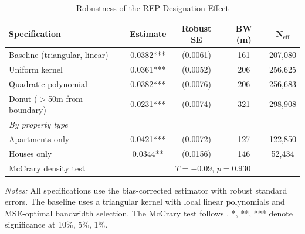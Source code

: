 \begin{table}[htbp]
\centering
\caption{Robustness of the REP Designation Effect}
\label{tab:robustness}
\begin{tabular}{lcccc}
\toprule
Specification & Estimate & Robust SE & BW (m) & N$_{\text{eff}}$ \\
\midrule
Baseline (triangular, linear) & 0.0382*** & (0.0061) & 161 & 207,080 \\
Uniform kernel & 0.0361*** & (0.0052) & 206 & 256,625 \\
Quadratic polynomial & 0.0382*** & (0.0076) & 206 & 256,683 \\
Donut ($>$50m from boundary) & 0.0231*** & (0.0074) & 321 & 298,908 \\
\midrule
\multicolumn{5}{l}{\textit{By property type}} \\
Apartments only & 0.0421*** & (0.0072) & 127 & 122,850 \\
Houses only & 0.0344** & (0.0156) & 146 & 52,434 \\
\midrule
McCrary density test & \multicolumn{4}{c}{$T = -0.09$, $p = 0.930$} \\
\bottomrule
\end{tabular}
\begin{tablenotes}
\small
\item \textit{Notes:} All specifications use the \citet{cattaneo2020} bias-corrected estimator with robust standard errors. The baseline uses a triangular kernel with local linear polynomials and MSE-optimal bandwidth selection. The McCrary test follows \citet{cattaneoJansson2020}. *, **, *** denote significance at 10\%, 5\%, 1\%.
\end{tablenotes}
\end{table}
